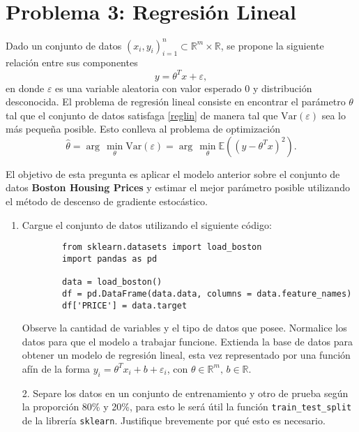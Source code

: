 \section*{Problema 3: Regresión Lineal}

Dado un conjunto de datos $(x_i,y_i)_{i=1}^n\subset\mathbb{R}^m\times\mathbb{R}$, se propone la siguiente relación entre sus componentes
\begin{equation}\label{reglin}
  y = \theta^Tx + \varepsilon,
\end{equation}
en donde $\varepsilon$ es una variable aleatoria con valor esperado 0 y distribución desconocida. El problema de regresión lineal consiste en encontrar el parámetro $\theta$ tal que el conjunto de datos satisfaga \eqref{reglin} de manera tal que $\mathrm{Var}(\varepsilon)$ sea lo más pequeña posible. Esto conlleva al problema de optimización
\[ \hat{\theta} = \arg\,\min_{\theta} \mathrm{Var}(\varepsilon) = \arg\,\min_{\theta}\mathbb{E}\left((y-\theta^Tx)^2\right).\]

El objetivo de esta pregunta es aplicar el modelo anterior sobre el conjunto de datos \textbf{Boston Housing Prices} y estimar el mejor parámetro posible utilizando el método de descenso de gradiente estocástico. 
\begin{enumerate}
    \item Cargue el conjunto de datos utilizando el siguiente código:
      \begin{verbatim}
        from sklearn.datasets import load_boston
        import pandas as pd
        
        data = load_boston()
        df = pd.DataFrame(data.data, columns = data.feature_names)
        df['PRICE'] = data.target
    \end{verbatim}
    
    Observe la cantidad de variables y el tipo de datos que posee. Normalice los datos para que el modelo a trabajar funcione. Extienda la base de datos para obtener un modelo de regresión lineal, esta vez representado por una función afín de la forma $y_i = \theta^Tx_i + b + \varepsilon_i$, con $\theta\in \mathbb{R}^m,\,b\in \mathbb{R}$.
\end{enumerate}

\begin{enumerate}    
    \item[2.] Separe los datos en un conjunto de entrenamiento y otro de prueba según la proporción 80\% y 20\%, para esto le será útil la función \texttt{train\_test\_split} de la librería \texttt{sklearn}. Justifique brevemente por qué esto es necesario.
\end{enumerate}

